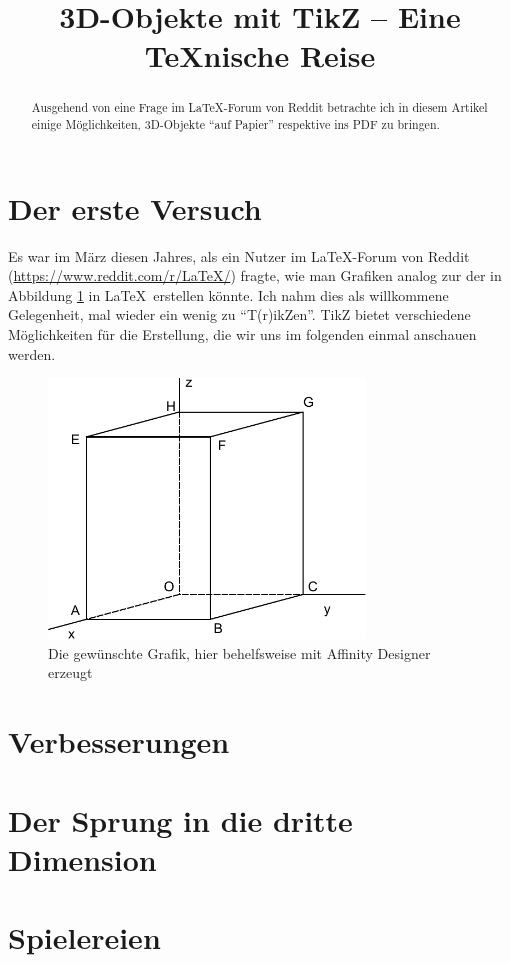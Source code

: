 \documentclass[12pt,ngerman]{dtk}
\title{3D-Objekte mit TikZ -- Eine \TeX nische Reise}
\begin{document}
\maketitle

\begin{abstract}
Ausgehend von eine Frage im \LaTeX-Forum von Reddit betrachte ich in diesem Artikel einige Möglichkeiten, 3D-Objekte \enquote{auf Papier} respektive ins PDF zu bringen.
\end{abstract}

\section{Der erste Versuch}

Es war im März diesen Jahres, als ein Nutzer im \LaTeX-Forum von Reddit (\url{https://www.reddit.com/r/LaTeX/}) fragte, wie man Grafiken analog zur der in Abbildung \ref{fig:template} in \LaTeX\ erstellen könnte.  Ich nahm dies als willkommene Gelegenheit, mal wieder ein wenig zu \enquote{T(r)ikZen}. TikZ bietet verschiedene Möglichkeiten für die Erstellung,  die wir uns im folgenden einmal anschauen werden.

\begin{figure}[h]
\begin{center}
\includegraphics[width=0.75\textwidth]{template}
\caption{Die gewünschte Grafik, hier behelfsweise mit Affinity Designer erzeugt}\label{fig:template}
\end{center}
\end{figure}


\section{Verbesserungen}

\section{Der Sprung in die dritte Dimension}

\section{Spielereien}
\end{document}
